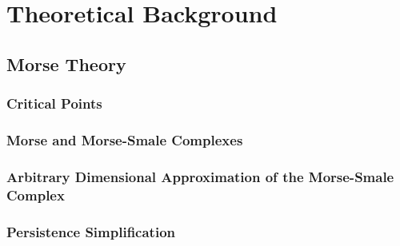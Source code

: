 
\chapter{Theoretical Background}
\section{Morse Theory}
\subsection{Critical Points}
\subsection{Morse and Morse-Smale Complexes}
\subsection{Arbitrary Dimensional Approximation of the Morse-Smale Complex}
\subsection{Persistence Simplification}

